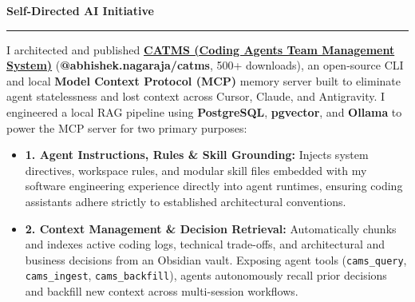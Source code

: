 \documentclass[9pt,letterpaper]{article} %
\newenvironment{rSection}[1]{ %
  \sectionskip
 \textbf{\Large #1} %
  \sectionlineskip
  \hrule %
  \begin{list}{}{ %
    \setlength{\leftmargin}{-0em} %
  }
  \item[]
}{
  \end{list}
}
\def\sectionlineskip{\smallskip} %
\def\sectionskip{} %
\begin{document}
\begin{rSection}{Self-Directed AI Initiative \vspace{.1em}}
I architected and published \href{https://www.npmjs.com/package/@abhishek.nagaraja/catms}{\textbf{CATMS (Coding Agents Team Management System)}} (\textbf{@abhishek.nagaraja/catms}, 500+ downloads), an open-source CLI and local \textbf{Model Context Protocol (MCP)} memory server built to eliminate agent statelessness and lost context across Cursor, Claude, and Antigravity. I engineered a local RAG pipeline using \textbf{PostgreSQL}, \textbf{pgvector}, and \textbf{Ollama} to power the MCP server for two primary purposes:

\begin{itemize}[left=-1.5em, labelsep=.1cm, labelwidth=.2cm, itemsep=0.0em, topsep=1pt]
\item \textbf{1. Agent Instructions, Rules \& Skill Grounding:} Injects system directives, workspace rules, and modular skill files embedded with my software engineering experience directly into agent runtimes, ensuring coding assistants adhere strictly to established architectural conventions.
\item \textbf{2. Context Management \& Decision Retrieval:} Automatically chunks and indexes active coding logs, technical trade-offs, and architectural and business decisions from an Obsidian vault. Exposing agent tools (\texttt{cams\_query}, \texttt{cams\_ingest}, \texttt{cams\_backfill}), agents autonomously recall prior decisions and backfill new context across multi-session workflows.
\end{itemize}
\end{rSection}
\end{document}
